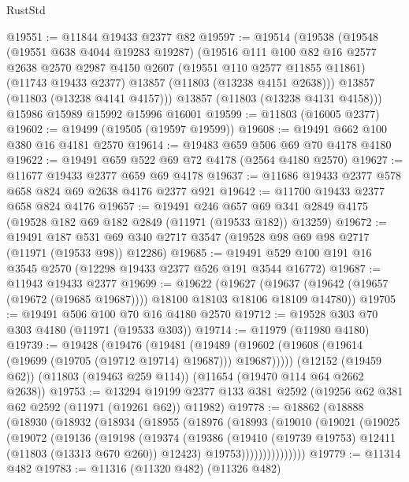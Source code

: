 \begin{lexlean}{RustStd}
\begin{coremodule}
@19551 := @11844 @19433 @2377 @82
@19597 := @19514
    (@19538
      (@19548
        (@19551 @638 @4044 @19283 @19287)
        (@19516
          @111
          @100
          @82
          @16
          @2577
          @2638
          @2570
          @2987
          @4150
          @2607
          (@19551 @110 @2577 @11855 @11861)
          (@11743 @19433 @2377)
          @13857
          (@11803 (@13238 @4151 @2638)))
        @13857
        (@11803 (@13238 @4141 @4157)))
      @13857
      (@11803 (@13238 @4131 @4158)))
    @15986
    @15989
    @15992
    @15996
    @16001
@19599 := @11803 (@16005 @2377)
@19602 := @19499 (@19505 (@19597 @19599))
@19608 := @19491 @662 @100 @380 @16 @4181 @2570
@19614 := @19483 @659 @506 @69 @70 @4178 @4180
@19622 := @19491 @659 @522 @69 @72 @4178 (@2564 @4180 @2570)
@19627 := @11677 @19433 @2377 @659 @69 @4178
@19637 := @11686 @19433 @2377 @578 @658 @824 @69 @2638 @4176 @2377 @921
@19642 := @11700 @19433 @2377 @658 @824 @4176
@19657 := @19491
    @246
    @657
    @69
    @341
    @2849
    @4175
    (@19528 @182 @69 @182 @2849 (@11971 (@19533 @182)) @13259)
@19672 := @19491
    @187
    @531
    @69
    @340
    @2717
    @3547
    (@19528 @98 @69 @98 @2717 (@11971 (@19533 @98)) @12286)
@19685 := @19491 @529 @100 @191 @16 @3545 @2570 (@12298 @19433 @2377 @526 @191 @3544 @16772)
@19687 := @11943 @19433 @2377
@19699 := @19622
    (@19627 (@19637 (@19642 (@19657 (@19672 (@19685 @19687)))) @18100 @18103 @18106 @18109 @14780))
@19705 := @19491 @506 @100 @70 @16 @4180 @2570
@19712 := @19528 @303 @70 @303 @4180 (@11971 (@19533 @303))
@19714 := @11979 (@11980 @4180)
@19739 := @19428
    (@19476
      (@19481 (@19489 (@19602 (@19608 (@19614 (@19699 (@19705 (@19712 @19714) @19687))) @19687)))))
    (@12152 (@19459 @62))
    (@11803 (@19463 @259 @114))
    (@11654 (@19470 @114 @64 @2662 @2638))
@19753 := @13294
    @19199
    @2377
    @133
    @381
    @2592
    (@19256 @62 @381 @62 @2592 (@11971 (@19261 @62)) @11982)
@19778 := @18862
    (@18888
      (@18930
        (@18932
          (@18934
            (@18955
              (@18976
                (@18993
                  (@19010
                    (@19021
                      (@19025
                        (@19072
                          (@19136
                            (@19198
                              (@19374
                                (@19386
                                  (@19410 (@19739 @19753) @12411 (@11803 (@13313 @670 @260)) @12423)
                                  @19753)))))))))))))))
@19779 := @11314 @482
@19783 := @11316 (@11320 @482) (@11326 @482)

\end{coremodule}
\end{lexlean}

